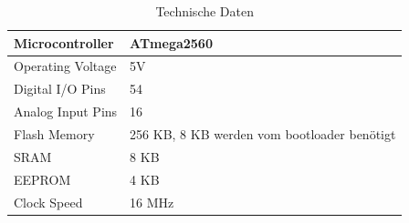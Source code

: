\begin{table}[h]
\centering
\caption{Technische Daten \cite[S.3]{arduinoMega}}
\begin{tabular}{|l|l|}
\hline 
Microcontroller & ATmega2560 \\ 
\hline 
Operating Voltage & 5V \\ 
\hline 
Digital I/O Pins & 54  \\ 
\hline 
Analog Input Pins & 16 \\ 
\hline 
Flash Memory & 256 KB, 8 KB werden vom bootloader benötigt\\ 
\hline 
SRAM & 8 KB \\ 
\hline 
EEPROM & 4 KB \\ 
\hline 
Clock Speed & 16 MHz \\ 
\hline 
\end{tabular}
\label{tab:arduinoMega_technischeDaten}
\end{table}
\newpage
